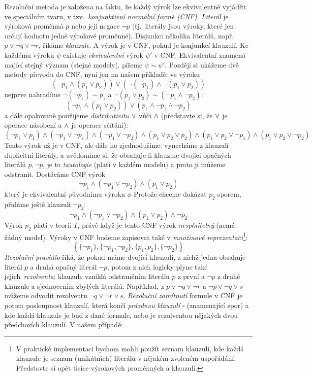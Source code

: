 Rezoluční metoda je založena na faktu, že každý výrok lze ekvivalentně vyjádřit ve speciálním tvaru, v tzv.\ \emph{konjunktivní normální formě (CNF)}. \emph{Literál} je výroková proměnná \(p\) nebo její negace \(\neg p\) (tj.\ literály jsou výroky, které jen určují hodnotu jedné výrokové proměnné). Disjunkci několika literálů, např. \( p \lor \neg q\lor \neg r\), říkáme \emph{klauzule}. A výrok je v CNF, pokud je konjunkcí klauzulí. Ke každému výroku \( \psi \) existuje \emph{ekvivalentní} výrok \( \psi' \) v {CNF}. Ekvivalentní znamená mající stejný význam (stejné modely), píšeme \( \psi \sim \psi' \). Později si ukážeme dvě metody převodu do CNF, nyní jen na našem příkladě: ve výroku
\[
    (\neg p_1 \land (p_1 \lor p_2)) \lor (\neg (\neg p_1) \land \neg (p_1 \lor p_2))
\]
nejprve nahradíme \( \neg (\neg p_1) \sim p_1 \) a \( \neg (p_1 \lor p_2) \sim (\neg p_1 \land \neg p_2) \):
\[
    (\neg p_1 \land (p_1 \lor p_2)) \lor (p_1 \land \neg p_1 \land \neg p_2)
\]
a dále opakovaně použijeme \emph{distributivitu} \( {\lor} \) vůči \( {\land} \) (představte si, že \( {\lor} \) je operace násobení a \( {\land} \) je operace sčítání):
\[
    (\neg p_1 \lor p_1) \land (\neg p_1 \lor \neg p_1) \land (\neg p_1 \lor \neg p_2) \land (p_1 \lor p_2 \lor p_2) \land (p_1 \lor p_2 \lor \neg p_1) \land (p_1 \lor p_2 \lor \neg p_2)
\]
Tento výrok už je v CNF, ale dále ho zjednodušíme: vynecháme z klauzulí duplicitní literály, a uvědomíme si, že obsahuje-li klauzule dvojici opačných literálů \( p, \neg p \), je to \emph{tautologie} (platí v každém modelu) a proto ji můžeme odstranit. Dostáváme CNF výrok
\[
    \neg p_1 \land (\neg p_1 \lor \neg p_2) \land (p_1 \lor p_2)
\]
který je ekvivalentní původnímu výroku \( \phi \)
Protože chceme dokázat \(p_2\) sporem, přidáme ještě klauzuli \(\neg p_2\):
\[
    \neg p_1 \land (\neg p_1 \lor \neg p_2) \land (p_1 \lor p_2) \land \neg p_2
\]
Výrok \(p_2\) platí v teorii \(T\), právě když je tento CNF výrok \emph{nesplnitelný} (nemá žádný model). Výroky v CNF budeme zapisovat také v \emph{množinové reprezentaci}\footnote{V praktické implementaci bychom mohli použít seznam klauzulí, kde každá klauzule je seznam (unikátních) literálů v nějakém zvoleném uspořádání. Představte si opět tisíce výrokových proměnných a klauzulí.}:
\[
    \left \{ \{\neg p_1\},\{\neg p_1,\neg p_2\},\{p_1, p_2\},\{\neg p_2\} \right \}
\]
\emph{Rezoluční pravidlo} říká, že pokud máme dvojici klauzulí, z nichž jedna obsahuje literál \(p\) a druhá opačný literál \(\neg p\), potom z nich logicky plyne také jejich\ \emph{rezolventa}: klauzule vzniklá odstraněním literálu \(p\) z první a \(\neg p\) z druhé klauzule a sjednocením zbylých literálů. Například, z \( p \lor \neg q\lor \neg r\) a \( \neg p \lor \neg q \lor s\) můžeme odvodit rezolventu \( \neg q \lor \neg r \lor s\). \emph{Rezoluční zamítnutí} formule v CNF je potom posloupnost klauzulí, která končí \emph{prázdnou klauzulí \( \square \)} (znamenající spor) a kde každá klauzule je buď z dané formule, nebo je rezolventou nějakých dvou předchozích klauzulí. V našem případě:
